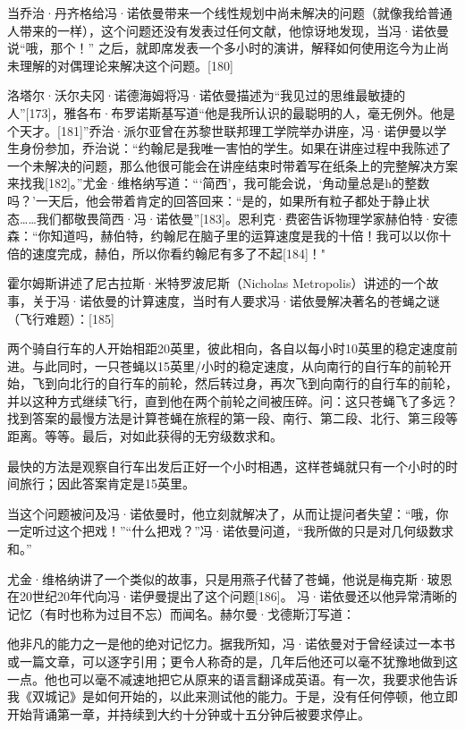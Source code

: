 当乔治·丹齐格给冯·诺依曼带来一个线性规划中尚未解决的问题（就像我给普通人带来的一样），这个问题还没有发表过任何文献，他惊讶地发现，当冯·诺依曼说“哦，那个！” 之后，就即席发表一个多小时的演讲，解释如何使用迄今为止尚未理解的对偶理论来解决这个问题。[180]

洛塔尔·沃尔夫冈·诺德海姆将冯·诺依曼描述为“我见过的思维最敏捷的人”[173]，雅各布·布罗诺斯基写道“他是我所认识的最聪明的人，毫无例外。他是个天才。[181]”乔治·派尔亚曾在苏黎世联邦理工学院举办讲座，冯·诺伊曼以学生身份参加，乔治说：“约翰尼是我唯一害怕的学生。如果在讲座过程中我陈述了一个未解决的问题，那么他很可能会在讲座结束时带着写在纸条上的完整解决方案来找我[182]。”尤金·维格纳写道：“‘简西’，我可能会说，‘角动量总是h的整数吗？’一天后，他会带着肯定的回答回来：“是的，如果所有粒子都处于静止状态……我们都敬畏简西·冯·诺依曼”[183]。恩利克·费密告诉物理学家赫伯特·安德森：“你知道吗，赫伯特，约翰尼在脑子里的运算速度是我的十倍！我可以以你十倍的速度完成，赫伯，所以你看约翰尼有多了不起[184]！"

霍尔姆斯讲述了尼古拉斯·米特罗波尼斯（Nicholas Metropolis）讲述的一个故事，关于冯·诺依曼的计算速度，当时有人要求冯·诺依曼解决著名的苍蝇之谜（飞行难题）：[185]

两个骑自行车的人开始相距20英里，彼此相向，各自以每小时10英里的稳定速度前进。与此同时，一只苍蝇以15英里/小时的稳定速度，从向南行的自行车的前轮开始，飞到向北行的自行车的前轮，然后转过身，再次飞到向南行的自行车的前轮，并以这种方式继续飞行，直到他在两个前轮之间被压碎。问：这只苍蝇飞了多远？找到答案的最慢方法是计算苍蝇在旅程的第一段、南行、第二段、北行、第三段等距离。等等。最后，对如此获得的无穷级数求和。

最快的方法是观察自行车出发后正好一个小时相遇，这样苍蝇就只有一个小时的时间旅行；因此答案肯定是15英里。

当这个问题被问及冯·诺依曼时，他立刻就解决了，从而让提问者失望：“哦，你一定听过这个把戏！”“什么把戏？”冯·诺依曼问道，“我所做的只是对几何级数求和。”

尤金·维格纳讲了一个类似的故事，只是用燕子代替了苍蝇，他说是梅克斯·玻恩在20世纪20年代向冯·诺伊曼提出了这个问题[186]。 冯·诺依曼还以他异常清晰的记忆（有时也称为过目不忘）而闻名。赫尔曼·戈德斯汀写道：

他非凡的能力之一是他的绝对记忆力。据我所知，冯·诺依曼对于曾经读过一本书或一篇文章，可以逐字引用；更令人称奇的是，几年后他还可以毫不犹豫地做到这一点。他也可以毫不减速地把它从原来的语言翻译成英语。有一次，我要求他告诉我《双城记》是如何开始的，以此来测试他的能力。于是，没有任何停顿，他立即开始背诵第一章，并持续到大约十分钟或十五分钟后被要求停止。

